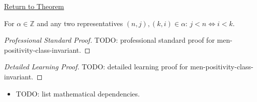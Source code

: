 \newpage
{}
\label{prf:men-positivity-class-invariant}

\begin{remark*}[Return]
\hyperref[lem:men-positivity-class-invariant]{Return to Theorem}
\end{remark*}

\begin{lemma*}
For $\alpha\in\mathbb{Z}$ and any two representatives
$(n,j),(k,i)\in\alpha$: $j<n \iff i<k$.
\end{lemma*}

\begin{proof}[Professional Standard Proof]
\LRAProofBodyStart
TODO: professional standard proof for men-positivity-class-invariant.
\end{proof}

\begin{proof}[Detailed Learning Proof]
\LRAProofBodyStart
TODO: detailed learning proof for men-positivity-class-invariant.
\end{proof}

\begin{remark*}
\end{remark*}

\begin{dependencies}
\begin{itemize}
  \item TODO: list mathematical dependencies.
\end{itemize}
\end{dependencies}

\clearpage
